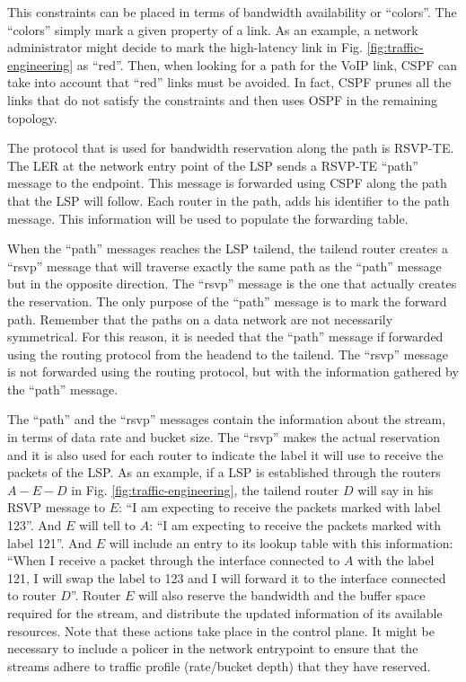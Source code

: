 This constraints can be placed in terms of bandwidth availability or ``colors''.
The ``colors'' simply mark a given property of a link.
As an example, a network administrator might decide to mark the high-latency link in Fig. \ref{fig:traffic-engineering} as ``red''.
Then, when looking for a path for the VoIP link, CSPF can take into account that ``red'' links must be avoided.
In fact, CSPF prunes all the links that do not satisfy the constraints and then uses OSPF in the remaining topology.

The protocol that is used for bandwidth reservation along the path is RSVP-TE.
The LER at the network entry point of the LSP sends a RSVP-TE ``path'' message to the endpoint.
This message is forwarded using CSPF along the path that the LSP will follow. 
Each router in the path, adds his identifier to the path message.
This information will be used to populate the forwarding table.

When the ``path'' messages reaches the LSP tailend, the tailend router creates a ``rsvp'' message that will traverse exactly the same path as the ``path'' message but in the opposite direction.
The ``rsvp'' message is the one that actually creates the reservation.
The only purpose of the ``path'' message is to mark the forward path.
Remember that the paths on a data network are not necessarily symmetrical.
For this reason, it is needed that the ``path'' message if forwarded using the routing protocol from the headend to the tailend.
The ``rsvp'' message is not forwarded using the routing protocol, but with the information gathered by the ``path'' message.

The ``path'' and the ``rsvp'' messages contain the information about the stream, in terms of data rate and bucket size.
The ``rsvp'' makes the actual reservation and it is also used for each router to indicate the label it will use to receive the packets of the LSP.
As an example, if a LSP is established through the routers $A-E-D$ in Fig. \ref{fig:traffic-engineering}, the tailend router $D$ will say in his RSVP message to $E$:
``I am expecting to receive the packets marked with label 123''.
And $E$ will tell to $A$: ``I am expecting to receive the packets marked with label 121''.
And $E$ will include an entry to its lookup table with this information: ``When I receive a packet through the interface connected to $A$ with the label 121, I will swap the label to 123 and I will forward it to the interface connected to router $D$''.
Router $E$ will also reserve the bandwidth and the buffer space required for the stream, and distribute the updated information of its available resources.
Note that these actions take place in the control plane. 
It might be necessary to include a policer in the network entrypoint to ensure that the streams adhere to traffic profile (rate/bucket depth) that they have reserved.


